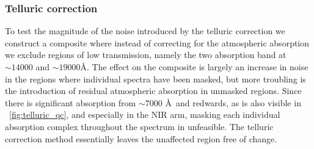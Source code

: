 \documentclass{aa}    %
\newcommand{\figref}[1]{\ref{fig:#1}}
\newcommand{\Fig}[1]{\figurename~\figref{#1}}
\newcommand{\fig}[1]{\Fig{#1}}
\newcommand{\sectlabel}[1]{\label{sect:#1}}
\begin{document}
{%
\subsubsection{Telluric correction}  \sectlabel{Telluric correction}
To test the magnitude of the noise introduced by the telluric correction we construct a composite where instead of correcting for the atmospheric absorption we exclude regions of low transmission, namely the two absorption band at $\sim 14000$ and $\sim 19000$\AA. The effect on the composite is largely an increase in noise in the regions where individual spectra have been masked, but more troubling is the introduction of residual atmospheric absorption in unmasked regions. Since there is significant absorption from $\sim 7000$ \AA~and redwards, as is also visible in \fig{telluric_qc}, and especially in the NIR arm, masking each individual absorption complex throughout the spectrum in unfeasible. The telluric correction method essentially leaves the unaffected region free of change. 



 
}
\end{document}
